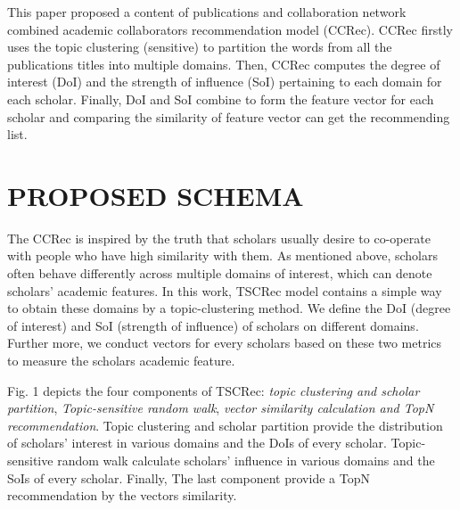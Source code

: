 \documentclass{chi-ext}
\begin{document}
This paper proposed a content of publications and collaboration network combined academic collaborators recommendation model (CCRec). CCRec firstly uses the topic clustering (sensitive) to partition the words from all the publications titles into multiple domains. Then, CCRec computes the degree of interest (DoI) and the strength of influence (SoI) pertaining to each domain for each scholar. Finally, DoI and SoI combine to form the feature vector for each scholar and comparing the similarity of feature vector can get the recommending list.


\section{PROPOSED SCHEMA}
The CCRec is inspired by the truth that scholars usually desire to co-operate with people who have high similarity with them.
As mentioned above, scholars often behave differently across multiple domains of interest, which can denote scholars' academic features. In this work, TSCRec model contains a simple way to obtain these domains by a topic-clustering method. We define the DoI (degree of interest) and SoI (strength of influence) of scholars on different domains. Further more, we conduct vectors for every scholars based on these two metrics to measure the scholars academic feature.


Fig. 1 depicts the four components of TSCRec: \textit{topic clustering and scholar partition}, \textit{Topic-sensitive random walk}, \textit{vector similarity calculation and TopN recommendation}. Topic clustering and scholar partition provide the distribution of scholars' interest in various domains and the DoIs of every scholar. Topic-sensitive random walk calculate scholars' influence in various domains and the SoIs of every scholar. Finally, The last component provide a TopN recommendation by the vectors similarity.
\end{document}
